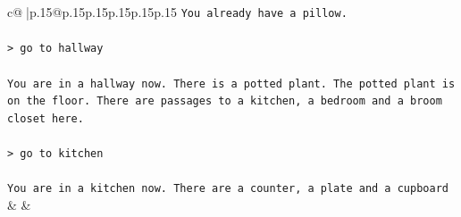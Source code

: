 \documentclass{article}
\begin{document}
{\begin{supertabular}{c@{$\;$}|p{.15\linewidth}@{}p{.15\linewidth}p{.15\linewidth}p{.15\linewidth}p{.15\linewidth}p{.15\linewidth}}
{{{\texttt{You already have a pillow.} \\
\\ 
\texttt{> go to hallway} \\
\\ 
\texttt{You are in a hallway now. There is a potted plant. The potted plant is on the floor. There are passages to a kitchen, a bedroom and a broom closet here.} \\
\\ 
\texttt{> go to kitchen} \\
\\ 
\texttt{You are in a kitchen now. There are a counter, a plate and a cupboard} \\
            }
        }
    }
    & & \\ \\


\end{supertabular}}
\end{document}
